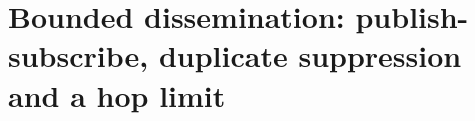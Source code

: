 \section{Bounded dissemination: publish-subscribe, duplicate suppression and a hop limit}
\label{sec:dissem}
%
